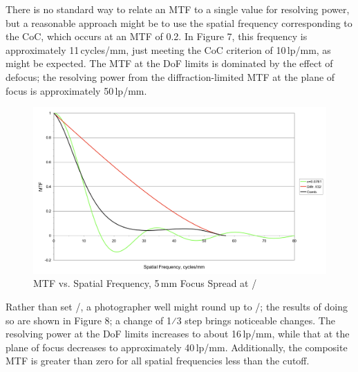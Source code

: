 \documentclass[11pt, oneside]{scrartcl}   	%
\newcommand{\f}[1]{\mbox{\raisebox{2pt}{\footnotesize $f$\hspace{-1.2pt}}/\hspace{-0.6pt}\raisebox{-0.6pt}{\small #1}}}
\begin{document}
There is no standard way to relate an MTF to a single value for resolving power, but a reasonable approach might be to use the spatial frequency corresponding to the CoC, which occurs at an MTF of 0.2. In Figure 7, this frequency is approximately 11\,cycles/mm, just meeting the CoC criterion of 10\,lp/mm, as might be expected. The MTF at the DoF limits is dominated by the effect of defocus; the resolving power from the diffraction-limited MTF at the plane of focus is approximately 50\,lp/mm.

\begin{figure}[htbp] %
   \centering
   \includegraphics[width=\linewidth]{figure/fig_dofd_8} 
   \caption{MTF vs. Spatial Frequency, 5\,mm Focus Spread at \f{32}}
   \label{fig:MTFvssf32}
\end{figure}
Rather than set \f{25}, a photographer well might round up to \f{32}; the results of doing so are shown in Figure 8; a change of 1⁄3 step brings noticeable changes. The resolving power at the DoF limits increases to about 16\,lp/mm, while that at the plane of focus decreases to approximately 40\,lp/mm. Additionally, the composite MTF is greater than zero for all spatial frequencies less than the cutoff.
\end{document}

